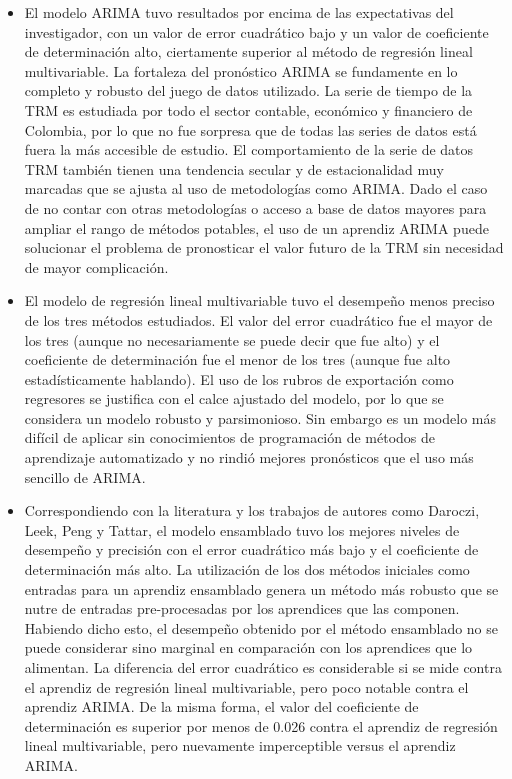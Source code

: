 \begin{itemize}
    \item El modelo ARIMA tuvo resultados por encima de las expectativas del investigador, con un valor de error cuadrático bajo y un valor de coeficiente de determinación alto, ciertamente superior al método de regresión lineal multivariable. La fortaleza del pronóstico ARIMA se fundamente en lo completo y robusto del juego de datos utilizado. La serie de tiempo de la TRM es estudiada por todo el sector contable, económico y financiero de Colombia, por lo que no fue sorpresa que de todas las series de datos está fuera la más accesible de estudio. El comportamiento de la serie de datos TRM también tienen una tendencia secular y de estacionalidad muy marcadas que se ajusta al uso de metodologías como ARIMA. Dado el caso de no contar con otras metodologías o acceso a base de datos mayores para ampliar el rango de métodos potables, el uso de un aprendiz ARIMA puede solucionar el problema de pronosticar el valor futuro de la TRM sin necesidad de mayor complicación. 
    \item El modelo de regresión lineal multivariable tuvo el desempeño menos preciso de los tres métodos estudiados. El valor del error cuadrático fue el mayor de los tres (aunque no necesariamente se puede decir que fue alto) y el coeficiente de determinación fue el menor de los tres (aunque fue alto estadísticamente hablando). El uso de los rubros de exportación como regresores se justifica con el calce ajustado del modelo, por lo que se considera un modelo robusto y parsimonioso. Sin embargo es un modelo más difícil de aplicar sin conocimientos de programación de métodos de aprendizaje automatizado y no rindió mejores pronósticos que el uso más sencillo de ARIMA.
    \item Correspondiendo con la literatura y los trabajos de autores como Daroczi, Leek, Peng y Tattar, el modelo ensamblado tuvo los mejores niveles de desempeño y precisión con el error cuadrático más bajo y el coeficiente de determinación más alto. La utilización de los dos métodos iniciales como entradas para un aprendiz ensamblado genera un método más robusto que se nutre de entradas pre-procesadas por los aprendices que las componen. Habiendo dicho esto, el desempeño obtenido por el método ensamblado no se puede considerar sino marginal en comparación con los aprendices que lo alimentan. La diferencia del error cuadrático es considerable si se mide contra el aprendiz de regresión lineal multivariable, pero poco notable contra el aprendiz ARIMA. De la misma forma, el valor del coeficiente de determinación es superior por menos de 0.026 contra el aprendiz de regresión lineal multivariable, pero nuevamente imperceptible versus el aprendiz ARIMA.
\end{itemize}


